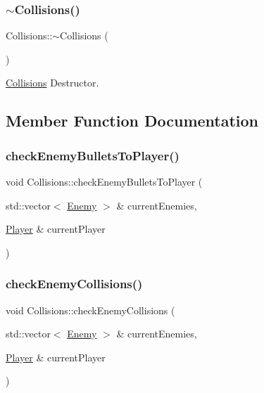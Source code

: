 \mbox{\label{class_collisions_a39a613fd2a130b096c616f74f776d2f9}} 
\subsubsection{\texorpdfstring{$\sim$\+Collisions()}{~Collisions()}}
{\footnotesize\ttfamily Collisions\+::$\sim$\+Collisions (\begin{DoxyParamCaption}{ }\end{DoxyParamCaption})}



\hyperlink{class_collisions}{Collisions} Destructor. 



\subsection{Member Function Documentation}
\mbox{\label{class_collisions_a421f805635d151a14481d5993fa3e9dc}} 
\subsubsection{\texorpdfstring{check\+Enemy\+Bullets\+To\+Player()}{checkEnemyBulletsToPlayer()}}
{\footnotesize\ttfamily void Collisions\+::check\+Enemy\+Bullets\+To\+Player (\begin{DoxyParamCaption}\item[{std\+::vector$<$ \hyperlink{class_enemy}{Enemy} $>$ \&}]{current\+Enemies,  }\item[{\hyperlink{class_player}{Player} \&}]{current\+Player }\end{DoxyParamCaption})\hspace{0.3cm}{\ttfamily [private]}}

\mbox{\label{class_collisions_aa628e8ae15bab7e085e4962be22ff16e}} 
\subsubsection{\texorpdfstring{check\+Enemy\+Collisions()}{checkEnemyCollisions()}}
{\footnotesize\ttfamily void Collisions\+::check\+Enemy\+Collisions (\begin{DoxyParamCaption}\item[{std\+::vector$<$ \hyperlink{class_enemy}{Enemy} $>$ \&}]{current\+Enemies,  }\item[{\hyperlink{class_player}{Player} \&}]{current\+Player }\end{DoxyParamCaption})}



